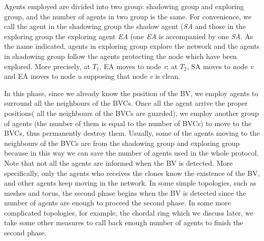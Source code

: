   Agents employed are divided into two group: shadowing group and exploring group, and the number of agents in two group is the same. For convenience, we call the agent in the shadowing group the shadow agent ({\em SA} and those in the exploring group the exploring agent {\em EA} (one {\em EA} is accompanied by one {\em SA}. As the name indicated, agents in exploring group explore the network and the agents in shadowing group follow the agents  protecting the node which have been explored. More precisely, at $T_1$, EA moves to node {\em v}; at $T_2$, SA moves to node {\em v} and EA moves to node {\em u} supposing that node {\em v} is clean. 

In this phase, since we already know the position of the BV, we employ agents to surround all the neighbours of the BVCs. Once all the agent arrive the proper positions( all the neighbours of the BVCs are guarded), we employ another group of agents (the number of them is equal to the number of BVCs) to move to the BVCs, thus permanently destroy them. Usually, some of the agents moving to the neighbours of the BVCs are from the shadowing group and exploring group because in this way we can save the number of agents used in the whole protocol. Note that not all the agents are informed when the BV is detected. More specifically, only the agents who receives the clones know the existence of the BV, and other agents keep moving in the network. In some simple topologies, such as meshes and torus, the second phase begins when the BV is detected since the number of agents are enough to proceed the second phase. In some more complicated topologies, for example, the chordal ring which we discuss later, we take some other measures to call back enough number of agents to finish the second phase.
